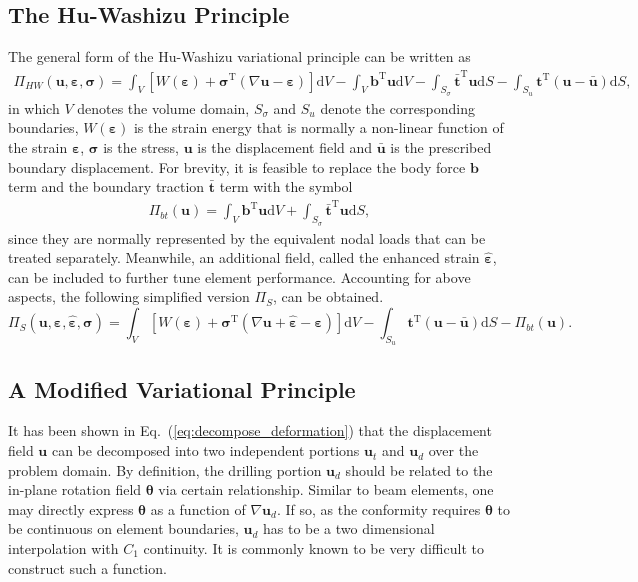 \documentclass[3p,sort&compress,review,11pt]{elsarticle}
\newcommand*{\md}[1]{\mathrm{d}#1}
\newcommand*{\mT}{\mathrm{T}}
\newcommand*{\eqsref}[1]{Eq.~(\ref{#1})}
\begin{document}
\subsection{The Hu-Washizu Principle}
The general form of the Hu-Washizu variational principle \citep{Hu1954} can be written as
\begin{gather*}
\varPi_{HW}\left(\mathbold{u},\mathbold{\varepsilon},\mathbold{\sigma}\right)=\int_V{}\left[W\left(\mathbold{\varepsilon}\right)+\mathbold{\sigma}^\mT\left(\nabla\mathbold{u}-\mathbold{\varepsilon}\right)\right]\md{V}-\int_V\mathbold{b}^\mT\mathbold{u}\md{V}-\int_{S_\sigma}\bar{\mathbold{t}}^\mT\mathbold{u}\md{S}-\int_{S_u}\mathbold{t}^\mT\left(\mathbold{u}-\bar{\mathbold{u}}\right)\md{S},
\end{gather*}
in which $V$ denotes the volume domain, $S_\sigma$ and $S_u$ denote the corresponding boundaries, $W\left(\mathbold{\varepsilon}\right)$ is the strain energy that is normally a non-linear function of the strain $\mathbold{\varepsilon}$, $\mathbold{\sigma}$ is the stress, $\mathbold{u}$ is the displacement field and $\bar{\mathbold{u}}$ is the prescribed boundary displacement. For brevity, it is feasible to replace the body force $\mathbold{b}$ term and the boundary traction $\bar{\mathbold{t}}$ term with the symbol
\begin{gather*}
\varPi_{bt}\left(\mathbold{u}\right)=\int_V\mathbold{b}^\mT\mathbold{u}\md{V}+\int_{S_\sigma}\bar{\mathbold{t}}^\mT\mathbold{u}\md{S},
\end{gather*}
since they are normally represented by the equivalent nodal loads that can be treated separately. Meanwhile, an additional field, called the enhanced strain $\hat{\mathbold{\varepsilon}}$, can be included to further tune element performance. Accounting for above aspects, the following simplified version $\varPi_S$, can be obtained.
\begin{equation}\label{eq:hu_washizu_simplified}
\varPi_S\left(\mathbold{u},\mathbold{\varepsilon},\hat{\mathbold{\varepsilon}},\mathbold{\sigma}\right)=\int_V\left[W\left(\mathbold{\varepsilon}\right)+\mathbold{\sigma}^\mT\left(\nabla\mathbold{u}+\hat{\mathbold{\varepsilon}}-\mathbold{\varepsilon}\right)\right]\md{V}-\int_{S_u}\mathbold{t}^\mT\left(\mathbold{u}-\bar{\mathbold{u}}\right)\md{S}-\varPi_{bt}\left(\mathbold{u}\right).
\end{equation}
\subsection{A Modified Variational Principle}
It has been shown in \eqsref{eq:decompose_deformation} that the displacement field $\mathbold{u}$ can be decomposed into two independent portions $\mathbold{u}_t$ and $\mathbold{u}_d$ over the problem domain. By definition, the drilling portion $\mathbold{u}_d$ should be related to the in-plane rotation field $\mathbold{\theta}$ via certain relationship. Similar to beam elements, one may directly express $\mathbold{\theta}$ as a function of $\nabla\mathbold{u}_d$. If so, as the conformity requires $\mathbold{\theta}$ to be continuous on element boundaries, $\mathbold{u}_d$ has to be a two dimensional interpolation with $C_1$ continuity. It is commonly known to be very difficult to construct such a function.
\end{document}
